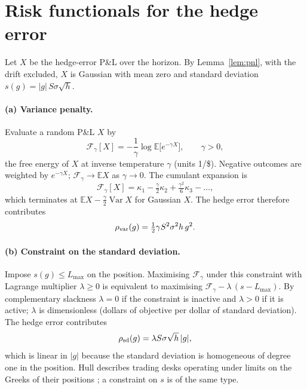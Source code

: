 \documentclass[11pt,a4paper]{article}
\theoremstyle{remark}
\newcommand{\E}{\mathbb{E}}
\newcommand{\Var}{\operatorname{Var}}
\newcommand{\F}{\mathcal{F}}
\begin{document}
\section{Risk functionals for the hedge error}\label{sec:scores}

Let $X$ be the hedge-error P\&L over the horizon. By Lemma~\ref{lem:pnl}, with the drift
excluded, $X$ is Gaussian with mean zero and standard deviation $s(g) = |g|\,S\sigma\sqrt h$.

\paragraph{(a) Variance penalty.} Evaluate a random P\&L $X$ by
\begin{equation}
  \F_\gamma[X] = -\frac1\gamma\log\E\bigl[e^{-\gamma X}\bigr], \qquad \gamma > 0 ,
\end{equation}
the free energy of $X$ at inverse temperature $\gamma$ (units 1/\$). Negative outcomes are
weighted by $e^{-\gamma X}$; $\F_\gamma\to\E X$ as $\gamma\to 0$. The cumulant expansion is
\begin{equation}
  \F_\gamma[X] = \kappa_1 - \tfrac{\gamma}{2}\kappa_2 + \tfrac{\gamma^2}{6}\kappa_3 - \dots ,
\end{equation}
which terminates at $\E X - \tfrac{\gamma}{2}\Var X$ for Gaussian $X$. The hedge error
therefore contributes
\begin{equation}
  \rho_{\rm var}(g) = \tfrac12\gamma S^2\sigma^2h\,g^2 .
\end{equation}

\paragraph{(b) Constraint on the standard deviation.} Impose $s(g)\le L_{\max}$ on the
position. Maximising $\F_\gamma$ under this constraint with Lagrange multiplier
$\lambda\ge 0$ is equivalent to maximising $\F_\gamma - \lambda\,(s - L_{\max})$. By
complementary slackness $\lambda = 0$ if the constraint is inactive and $\lambda>0$ if it is
active; $\lambda$ is dimensionless (dollars of objective per dollar of standard deviation).
The hedge error contributes
\begin{equation}
  \rho_{\rm sd}(g) = \lambda S\sigma\sqrt h\,|g| ,
\end{equation}
which is linear in $|g|$ because the standard deviation is homogeneous of degree one in the
position. Hull describes trading desks operating under limits on the Greeks of their
positions \cite[ch.~19]{hull}; a constraint on $s$ is of the same type.
\end{document}
